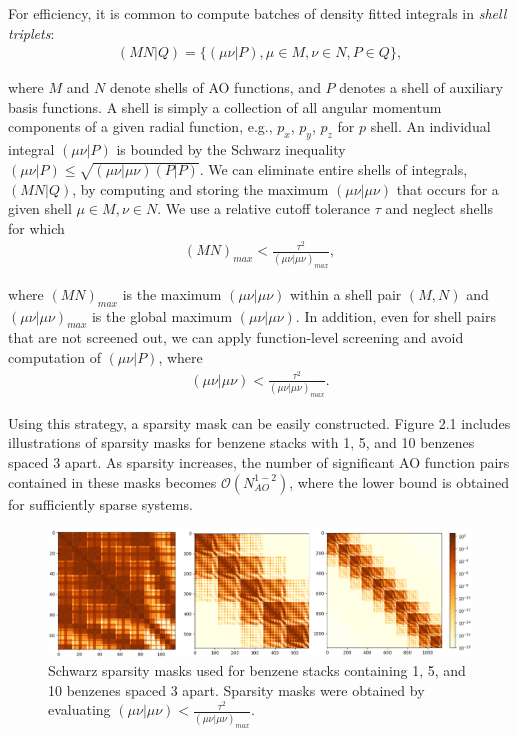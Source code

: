 For efficiency, it is common to compute batches of density fitted integrals in \textit{shell triplets}: 
\begin{align} 
(M N | Q) = \{(\mu \nu|P), \mu \in M, \nu \in N, P \in Q\}, 
\end{align} 

\noindent where $M$ and $N$ denote shells of AO functions, and $P$ denotes a shell of auxiliary basis functions. 
A shell is simply a collection of all angular momentum components of a given radial function, e.g., $p_x$, $p_y$, $p_z$ for $p$ shell. 
An individual integral $(\mu \nu | P)$ is bounded by the Schwarz inequality $(\mu \nu | P) \leq 
\sqrt{(\mu \nu | \mu \nu)(P|P)}$. We can eliminate entire shells of integrals, $(MN|Q)$, by computing
and storing the maximum $(\mu \nu | \mu \nu)$ that occurs for a given shell $\mu \in M, \nu \in N$. We use a relative cutoff tolerance
$\tau$ and neglect shells for which 
\begin{align}
(MN)_{max} < \frac{\tau^2}{(\mu \nu | \mu \nu)_{max}},
\end{align}

\noindent where $(MN)_{max}$ is the maximum $(\mu \nu | \mu \nu)$
within a shell pair $(M, N)$ and $(\mu \nu | \mu \nu)_{max}$ is the global maximum $(\mu \nu | \mu \nu)$. In addition, even for shell pairs
that are not screened out, we can apply function-level screening and avoid computation of $(\mu \nu | P)$, where
\begin{align}
(\mu \nu | \mu \nu) < \frac{\tau^2}{(\mu \nu | \mu \nu)_{max}}.
\end{align}

Using this strategy, a sparsity mask can be easily constructed. Figure 2.1 includes
illustrations of sparsity masks for benzene stacks with 1, 5, and 10 benzenes spaced 3\text{\AA} apart. As sparsity increases, the number of
significant AO function pairs contained in these masks becomes $\mathcal{O}(N_{AO}^{1-2})$, where the lower bound is obtained for 
sufficiently sparse systems. 

\begin{figure}[H] 
\centering
\includegraphics[scale=0.2]{figures/sparsity_plots/sparsity_masks.png} \caption{Schwarz sparsity masks used for benzene stacks containing 
1, 5, and 10 benzenes spaced 3\text{\AA}  apart. Sparsity masks were obtained by evaluating $(\mu\nu|\mu\nu)<\frac{\tau^2}{(\mu\nu|\mu\nu)_{max}}$.}
\label{fig:databases} \end{figure}


